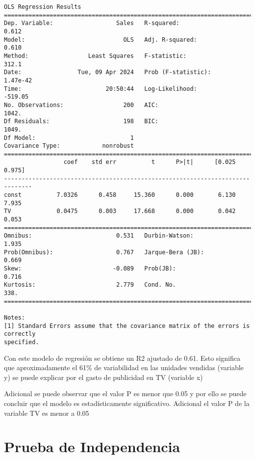 \documentclass[11pt]{article}
\begin{document}
    \begin{Verbatim}[commandchars=\\\{\}]
                            OLS Regression Results
==============================================================================
Dep. Variable:                  Sales   R-squared:                       0.612
Model:                            OLS   Adj. R-squared:                  0.610
Method:                 Least Squares   F-statistic:                     312.1
Date:                Tue, 09 Apr 2024   Prob (F-statistic):           1.47e-42
Time:                        20:50:44   Log-Likelihood:                -519.05
No. Observations:                 200   AIC:                             1042.
Df Residuals:                     198   BIC:                             1049.
Df Model:                           1
Covariance Type:            nonrobust
==============================================================================
                 coef    std err          t      P>|t|      [0.025      0.975]
------------------------------------------------------------------------------
const          7.0326      0.458     15.360      0.000       6.130       7.935
TV             0.0475      0.003     17.668      0.000       0.042       0.053
==============================================================================
Omnibus:                        0.531   Durbin-Watson:                   1.935
Prob(Omnibus):                  0.767   Jarque-Bera (JB):                0.669
Skew:                          -0.089   Prob(JB):                        0.716
Kurtosis:                       2.779   Cond. No.                         338.
==============================================================================

Notes:
[1] Standard Errors assume that the covariance matrix of the errors is correctly
specified.
    \end{Verbatim}

    Con este modelo de regresión se obtiene un R2 ajustado de 0.61. Esto
significa que aproximadamente el 61\% de variabilidad en las unidades
vendidas (variable y) se puede explicar por el gasto de publicidad en TV
(variable x)

Adicional se puede observar que el valor P es menor que 0.05 y por ello
se puede concluir que el modelo es estadísticamente significativo.
Adicional el valor P de la variable TV es menor a 0.05

    \section{Prueba de Independencia}\label{prueba-de-independencia}
\end{document}
